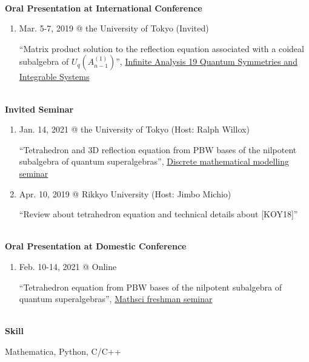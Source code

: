 \documentclass[dvipdfmx]{jsarticle}
\begin{document}
%
%
%
%
{\ }\\
\vspace{3mm}
{\bf\large Oral Presentation at International Conference}
\vspace{-6mm}
\\\hrulefill
\begin{enumerate}
\renewcommand*\theenumi{\the\numexpr\value{paperCounter2}-\value{enumi}}
\setcounter{paperCounter2}{2}
\item
Mar. 5-7, 2019 @ the University of Tokyo (Invited)
\par
``Matrix product solution to the reflection equation associated with a coideal subalgebra of $U_q(A_{n-1}^{(1)})$'', \href{https://sites.google.com/view/ia19/home}{Infinite Analysis 19 Quantum Symmetries and Integrable Systems}
\end{enumerate}
%
%
%
%
{\ }\\
\vspace{3mm}
{\bf\large Invited Seminar}
\vspace{-6mm}
\\\hrulefill
\begin{enumerate}
\renewcommand*\theenumi{\the\numexpr\value{paperCounter3}-\value{enumi}}
\setcounter{paperCounter3}{3}
\item
Jan. 14, 2021 @ the University of Tokyo (Host: Ralph Willox)
\par
``Tetrahedron and 3D reflection equation from PBW bases of the nilpotent subalgebra of quantum superalgebras'', \href{https://www.ms.u-tokyo.ac.jp/seminar/discrete_e/past_e.html}{Discrete mathematical modelling seminar}
%
%
\item
Apr. 10, 2019 @ Rikkyo University (Host: Jimbo Michio)
\par
``Review about tetrahedron equation and technical details about [KOY18]''
\end{enumerate}
%
%
%
%
{\ }\\
\vspace{3mm}
{\bf\large Oral Presentation at Domestic Conference}
\vspace{-6mm}
\\\hrulefill
\begin{enumerate}
\renewcommand*\theenumi{\the\numexpr\value{paperCounter4}-\value{enumi}}
\setcounter{paperCounter4}{2}
\item
Feb. 10-14, 2021 @ Online
\par
``Tetrahedron equation from PBW bases of the nilpotent subalgebra of quantum superalgebras'', \href{https://sites.google.com/view/math-graduate/MATHSCI-FRESHMAN-SEMINAR/2021}{Mathsci freshman seminar}
\end{enumerate}
%
%
%
%
{\ }\\
\vspace{3mm}
{\bf\large Skill}
\vspace{-6mm}
\\\hrulefill
\par
Mathematica, Python, C/C++
%
%
%
%
\end{document}
